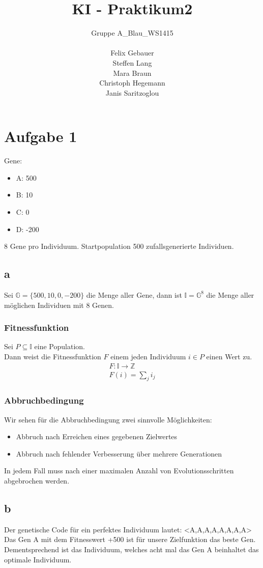 \documentclass[12pt, a4paper]{article}
\title{KI - Praktikum2}
\author{Gruppe A\_Blau\_WS1415\\\\
    Felix Gebauer\\
    Steffen Lang\\
    Mara Braun\\
    Christoph Hegemann\\
    Janis Saritzoglou}
\begin{document}
\maketitle
\newpage
\section*{Aufgabe 1}
Gene:
\begin{itemize}
\item A: 500
\item B: 10
\item C: 0
\item D: -200
\end{itemize}
8 Gene pro Individuum. Startpopulation 500 zufallsgenerierte
Individuen.

\subsection*{a}
Sei $\mathbb{G} = \{500,10,0,-200\}$ die Menge aller Gene, dann ist
$\mathbb{I} = \mathbb{G}^8$ die Menge aller möglichen Individuen mit 8
Genen.

\subsubsection*{Fitnessfunktion}
Sei $P \subseteq \mathbb{I}$ eine Population.\\
Dann weist die Fitnessfunktion $F$ einem jeden Individuum $i \in P$
einen Wert zu.\\
\begin{align*}
F: \mathbb{I} \longrightarrow \mathbb{Z}\\
F(i) = \sum_j i_j
\end{align*}

\subsubsection*{Abbruchbedingung}
Wir sehen für die Abbruchbedingung zwei sinnvolle Möglichkeiten:
\begin{itemize}
\item Abbruch nach Erreichen eines gegebenen Zielwertes
\item Abbruch nach fehlender Verbesserung über mehrere Generationen
\end{itemize}
In jedem Fall muss nach einer maximalen Anzahl von Evolutionsschritten
abgebrochen werden.

\subsection*{b}
Der genetische Code für ein perfektes Individuum lautet: <A,A,A,A,A,A,A,A>
Das Gen A mit dem Fitnesswert +500 ist für unsere Zielfunktion das beste Gen. Dementsprechend ist das Individuum, welches acht mal das Gen A beinhaltet das optimale Individuum.
\end{document}
